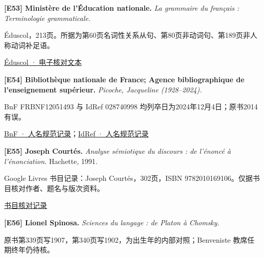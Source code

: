 \par\noindent\begin{minipage}{\linewidth}
\label{ref-53}\noindent\textbf{[E53] Ministère de l’Éducation nationale.} \textit{La grammaire du français : Terminologie grammaticale.}\par\nobreak
Éduscol，213页。所据为第60页名词性关系从句、第80页非动词句、第189页非人称动词补足语。\par
{\small\href{https://eduscol.education.fr/document/1872/download}{Éduscol · 电子核对文本}}\par
\par\end{minipage}\par

\par\noindent\begin{minipage}{\linewidth}
\label{ref-54}\noindent\textbf{[E54] Bibliothèque nationale de France; Agence bibliographique de l’enseignement supérieur.} \textit{Picoche, Jacqueline (1928–2024).}\par\nobreak
BnF FRBNF12051493 与 IdRef 028740998 均列卒日为2024年12月4日；原书2014有误。\par
{\small\href{https://catalogue.bnf.fr/ark:/12148/cb12051493n}{BnF · 人名规范记录}；\href{https://www.idref.fr/028740998}{IdRef · 人名规范记录}}\par
\par\end{minipage}\par

\par\noindent\begin{minipage}{\linewidth}
\label{ref-55}\noindent\textbf{[E55] Joseph Courtés.} \textit{Analyse sémiotique du discours : de l’énoncé à l’énonciation.} Hachette, 1991.\par\nobreak
Google Livres 书目记录：Joseph Courtés，302页，ISBN 9782010169106。仅据书目核对作者、题名与版次资料。\par
{\small\href{https://books.google.fr/books?id=ont0QgAACAAJ}{书目核对记录}}\par
\par\end{minipage}\par

\par\noindent\begin{minipage}{\linewidth}
\label{ref-56}\noindent\textbf{[E56] Lionel Spinosa.} \textit{Sciences du langage : de Platon à Chomsky.}\par\nobreak
原书第339页写1907，第340页写1902，为出生年的内部对照；Benveniste 教席任期终年仍待核。\par
\par\end{minipage}\par

